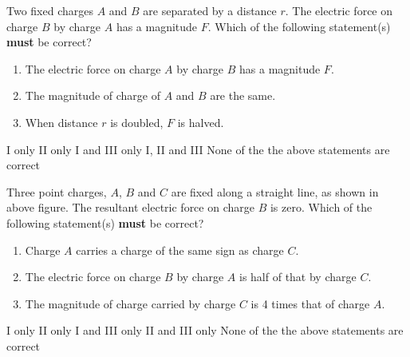 \documentclass{../../../oss-apphys-exam}
\begin{document}

\raggedcolumns



\begin{questions}
  \question Two fixed charges $A$ and $B$ are separated by a distance $r$. The
  electric force on charge $B$ by charge $A$ has a magnitude $F$. Which of the
  following statement(s) \textbf{must} be correct?
  \begin{enumerate}[label=\Roman*.,nosep]
  \item The electric force on charge $A$ by charge $B$ has a magnitude $F$.
  \item The magnitude of charge of $A$ and $B$ are the same.
  \item When distance $r$ is doubled, $F$ is halved.
  \end{enumerate}
  \begin{choices}
    \choice I only
    \choice II only
    \choice I and III only
    \choice I, II and III
    \choice None of the the above statements are correct
  \end{choices}
  \question Three point charges, $A$, $B$ and $C$ are fixed along a straight
  line, as shown in above figure. The resultant electric force on charge $B$ is
  zero. Which of the following statement(s) \textbf{must} be correct?
  \begin{enumerate}[label=\Roman*.,nosep]
  \item Charge $A$ carries a charge of the same sign as charge $C$.
  \item The electric force on charge $B$ by charge $A$ is half of that by
    charge $C$.
  \item The magnitude of charge carried by charge $C$ is 4 times that of charge
    $A$.
  \end{enumerate}
  \begin{choices}
    \choice I only
    \choice II only
    \choice I and III only
    \choice II and III only
    \choice None of the the above statements are correct
  \end{choices}
  

\end{questions}
\end{document}
